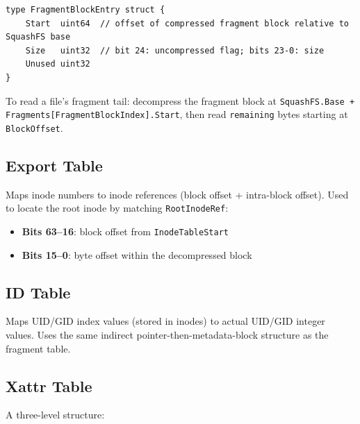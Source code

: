 \documentclass[11pt,a4paper]{article}
\begin{document}
\begin{lstlisting}[style=gostyle]
type FragmentBlockEntry struct {
    Start  uint64  // offset of compressed fragment block relative to SquashFS base
    Size   uint32  // bit 24: uncompressed flag; bits 23-0: size
    Unused uint32
}
\end{lstlisting}

To read a file's fragment tail: decompress the fragment block at
\texttt{SquashFS.Base + Fragments[FragmentBlockIndex].Start}, then read
\texttt{remaining} bytes starting at \texttt{BlockOffset}.

\subsection{Export Table}

Maps inode numbers to inode references (block offset + intra-block
offset). Used to locate the root inode by matching
\texttt{RootInodeRef}:

\begin{itemize}
    \item \textbf{Bits 63--16}: block offset from \texttt{InodeTableStart}
    \item \textbf{Bits 15--0}: byte offset within the decompressed block
\end{itemize}

\subsection{ID Table}

Maps UID/GID index values (stored in inodes) to actual UID/GID integer
values. Uses the same indirect pointer-then-metadata-block structure as
the fragment table.

\subsection{Xattr Table}

A three-level structure:
\end{document}
